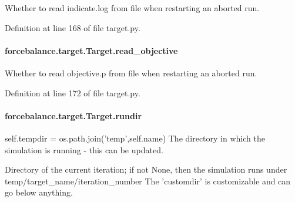 Whether to read indicate.\-log from file when restarting an aborted run. 



Definition at line 168 of file target.\-py.

\hypertarget{classforcebalance_1_1target_1_1Target_a22bdc4bbce2020ae44b44ad3e444fda6}{
\paragraph[{read\-\_\-objective}]{\setlength{\rightskip}{0pt plus 5cm}forcebalance.\-target.\-Target.\-read\-\_\-objective\hspace{0.3cm}{\ttfamily [inherited]}}}\label{classforcebalance_1_1target_1_1Target_a22bdc4bbce2020ae44b44ad3e444fda6}


Whether to read objective.\-p from file when restarting an aborted run. 



Definition at line 172 of file target.\-py.

\hypertarget{classforcebalance_1_1target_1_1Target_a6872de5b2d4273b82336ea5b0da29c9e}{
\paragraph[{rundir}]{\setlength{\rightskip}{0pt plus 5cm}forcebalance.\-target.\-Target.\-rundir\hspace{0.3cm}{\ttfamily [inherited]}}}\label{classforcebalance_1_1target_1_1Target_a6872de5b2d4273b82336ea5b0da29c9e}


self.\-tempdir = os.\-path.\-join('temp',self.\-name) The directory in which the simulation is running -\/ this can be updated. 

Directory of the current iteration; if not None, then the simulation runs under temp/target\-\_\-name/iteration\-\_\-number The 'customdir' is customizable and can go below anything.

